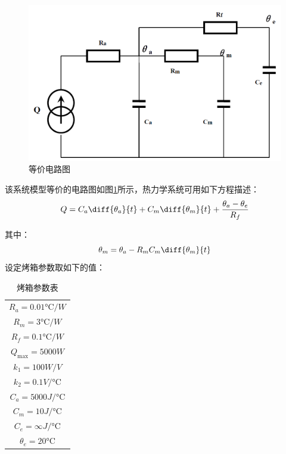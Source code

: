 \documentclass[11pt]{article}
\begin{document}
\begin{figure}[H]
  \centering
  \includegraphics[width=1.0\textwidth]{等价电路图.png}
  \caption{等价电路图}
  \label{fig:等价电路图}
\end{figure}
该系统模型等价的电路图如图\ref{fig:等价电路图}所示，热力学系统可用如下方程描述：
\begin{equation}
  Q=C_a\diff{\theta_a}{t}+C_m\diff{\theta_m}{t}+\frac{\theta_a-\theta_e}{R_f}
  \label{eq:烤箱热力学方程}
\end{equation}\par
其中：
\begin{equation*}
  \theta_m=\theta_a-R_mC_m\diff{\theta_m}{t}
\end{equation*}
设定烤箱参数取如下的值：
\begin{table}[H]
  \centering
  \renewcommand{\arraystretch}{1.5}
  \caption{烤箱参数表}
  \begin{tabular}{c}
    $R_a=0.01\unit{\celsius/W}$   \\
    $R_m=3\unit{\celsius/W}$      \\
    $R_f=0.1\unit{\celsius/W}$    \\
    $Q_\mathrm{max}=5000\unit{W}$ \\
    $k_1=100\unit{W/V}$           \\
    $k_2=0.1\unit{V/\celsius}$    \\
    $C_a=5000\unit{J/\celsius}$   \\
    $C_m=10\unit{J/\celsius}$     \\
    $C_e=\infty\unit{J/\celsius}$ \\
    $\theta_e=20\unit{\celsius}$  \\
  \end{tabular}
\end{table}
\end{document}
